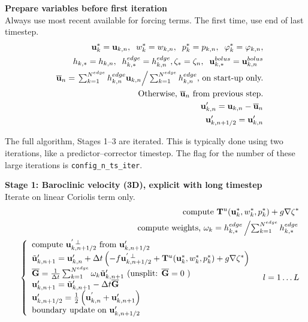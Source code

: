 \documentclass[11pt]{report}
\begin{document}
{\bf Prepare variables before first iteration}\\
Always use most recent available for forcing terms.  The first time, use end of last timestep.
\begin{eqnarray} &&
{\bf u}_k^*={\bf u}_{k,n},\;\;
w_k^*=w_{k,n},\;\;
p_k^*=p_{k,n}, \;\;
{\varphi}_k^* = {\varphi}_{k,n},\\&&
h_{k,*} = h_{k,n}, \;\; h_{k,*}^{edge} = h_{k,n}^{edge},
\zeta_{*} = \zeta_n,\;\;
{\bf u}_{k,*}^{bolus} = {\bf u}_{k,n}^{bolus} \\&&
\overline{\bf u}_n = \left. \textstyle \sum_{k=1}^{N^{edge}}
h_{k,n}^{edge}  {\bf u}_{k,n}
\right/\textstyle 
\sum_{k=1}^{N^{edge}}h_{k,n}^{edge} 
\mbox{, on start-up only.}
\\&&
\mbox{Otherwise, }\overline{\bf u}_n\mbox{ from previous step.}\\&&
{\bf u}'_{k,n} = {\bf u}_{k,n} - \overline{\bf u}_n \label{ubcl10}
\\&&
{\bf u}_{k,n+1/2}'={\bf u}_{k,n}' 
\end{eqnarray}

The full algorithm, Stages 1--3 are iterated.  This is typically done using two iterations, like a predictor--corrector timestep.  The flag for the number of these large iterations is {\tt config\_n\_ts\_iter}.

{\bf Stage 1: Baroclinic velocity (3D), explicit with long timestep}\\
Iterate on linear Coriolis term only.
\begin{eqnarray} &&
\mbox{compute } {\bf T}^u({\bf u}_k^*,w_k^*,p_k^*) +g\nabla \zeta^* \\ &&
\mbox{compute weights, }\omega_k  =  h_{k,*}^{edge}
\left/\textstyle\sum_{k=1}^{N^{edge}} h_{k,*}^{edge}
\right.\\ &&
\left\{\begin{array}{l} \label{u bcl s2} 
\mbox{compute }{\bf u}_{k,n+1/2}^{'\;\perp}\mbox{ from }{\bf u}_{k,n+1/2}'\\ 
{\tilde {\bf u}}'_{k,n+1} = {\bf u}'_{k,n} + \Delta t 
\left( -f{\bf u}_{k,n+1/2}^{'\;\perp} + {\bf T}^u({\bf u}_k^*,w_k^*,p_k^*) 
+g\nabla \zeta^* \right)
\\  
{\overline {\bf G}} = 
\frac{1}{\Delta t}
\sum_{k=1}^{N^{edge}} \omega_k {\tilde {\bf u}}'_{k,n+1}
\mbox{ (unsplit: ${\overline {\bf G}} =0$ )}
\\ 
{\bf u}'_{k,n+1} = {\tilde {\bf u}}'_{k,n+1} - \Delta t {\overline {\bf G}}
\\
{\bf u}'_{k,n+1/2} = \frac{1}{2}\left({\bf u}^{'}_{k,n} +{\bf u}'_{k,n+1}\right) 
\\
\mbox{boundary update on }{\bf u}'_{k,n+1/2}
\end{array}
\right. \;\;\; l=1\ldots L \\ &&
\end{eqnarray}
\end{document}
